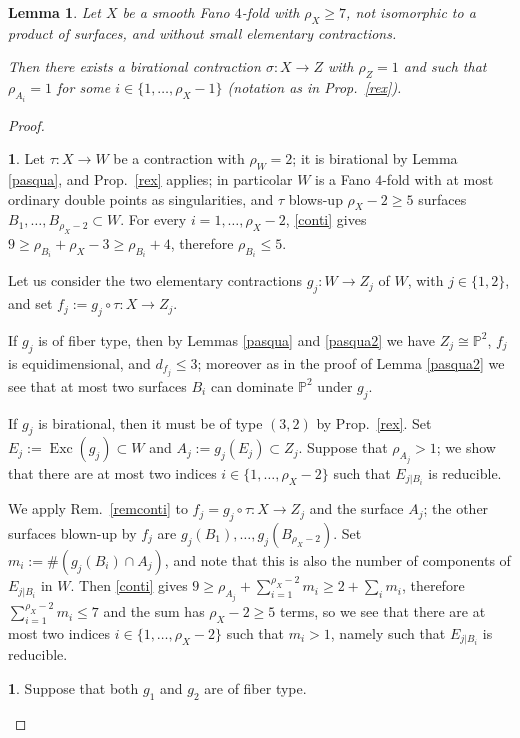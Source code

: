\documentclass[a4paper,12pt]{amsart}
\newtheorem{lemma}[thm]{Lemma}
\theoremstyle{definition}
\newtheorem{prg}[thm]{}
\numberwithin{figure}{section}
\numberwithin{table}{section}
\newcommand{\pr}{\mathbb{P}}
\newcommand{\Exc}{\operatorname{Exc}}
\begin{document}
\begin{lemma}\label{dolonne}
  Let $X$ be a smooth Fano $4$-fold with $\rho_X\geq 7$, not isomorphic to a product of surfaces, and without small elementary contractions.

  Then there exists a birational contraction $\sigma\colon X\to Z$ with
$\rho_Z=1$ and such that $\rho_{A_i}=1$ for some $i\in\{1,\dotsc,\rho_X-1\}$
  (notation as in Prop.~\ref{rex}).
\end{lemma}
  \begin{proof}\begin{prg}\label{prel}
  Let  $\tau\colon X\to W$ be a contraction with $\rho_W=2$; it is birational by Lemma \ref{pasqua}, and Prop.~\ref{rex} applies; in particolar $W$ is a Fano $4$-fold with at most ordinary double points as singularities, and $\tau$ blows-up $\rho_X-2\geq 5$ surfaces $B_1,\dotsc,B_{\rho_X-2}\subset W$.  For every $i=1,\dotsc,\rho_X-2$, \eqref{conti} gives $9\geq \rho_{B_i}+\rho_X-3\geq \rho_{B_i}+4$, therefore $\rho_{B_i}\leq 5$.

  Let us consider
  the two elementary contractions  $g_j\colon W\to Z_j$ of $W$, with
  $j\in\{1,2\}$, and set $f_j:=g_j\circ\tau\colon X\to Z_j$.

If $g_j$ is of fiber type, then
by Lemmas \ref{pasqua} and \ref{pasqua2} we have  $Z_j\cong\pr^2$, $f_j$ is equidimensional, and $d_{f_j}\leq 3$; moreover as in the proof of Lemma \ref{pasqua2} we see that at most two surfaces $B_i$ can dominate $\pr^2$ under $g_j$.

\medskip

If $g_j$ is birational, then it must be of type $(3,2)$ by Prop.~\ref{rex}.
Set $E_j:=\Exc(g_j)\subset W$ and $A_j:=g_j(E_j)\subset Z_j$.
Suppose that $\rho_{A_j}>1$; we show that there are at most two indices $i\in\{1,\dotsc,\rho_X-2\}$ such that  $E_{j|B_i}$ is reducible.

 We apply Rem.~\ref{remconti} to $f_j=g_j\circ\tau\colon X\to Z_j$ and the surface $A_j$; the other surfaces blown-up by $f_j$ are $g_j(B_1),\dotsc,g_j(B_{\rho_X-2})$. Set $m_{i}:=\#(g_j(B_i)\cap A_j)$, and note that this is also the number of components of $E_{j|B_i}$ in $W$.  Then \eqref{conti} gives $9\geq\rho_{A_j}+\sum_{i=1}^{\rho_X-2}m_{i}\geq 2+
 \sum_{i}m_{i}$, therefore $\sum_{i=1}^{\rho_X-2}m_{i}\leq 7$ and the sum has $\rho_X-2\geq 5$ terms, so
 we see that there are at most two indices $i\in\{1,\dotsc,\rho_X-2\}$ such that $m_{i}>1$, namely such that $E_{j|B_i}$ is reducible.
 \end{prg}
 \begin{prg}\label{fibertype}
   Suppose that both $g_1$ and $g_2$ are of fiber type.
   

\end{prg}
\end{proof}
\end{document}
